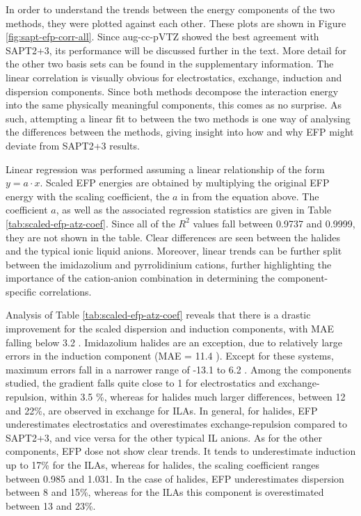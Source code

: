 In order to understand the trends between the energy components of the two methods, they were plotted against each other. 
These plots are shown in Figure \ref{fig:sapt-efp-corr-all}.
Since aug-cc-pVTZ showed the best agreement with SAPT2+3,  its performance will be discussed further in the text. 
More detail for the other two basis sets can be found in the supplementary information.
The linear correlation is visually obvious for electrostatics, exchange, induction and dispersion components.
Since both methods decompose the interaction energy into the same physically meaningful components, this comes as no surprise.
As such, attempting a linear fit to between the two methods is one way of analysing the differences between the methods, giving insight into how and why EFP might deviate from SAPT2+3 results.


Linear regression was performed assuming a linear relationship of the form $ y = a \cdot x $.
Scaled EFP energies are obtained by multiplying the original EFP energy with the scaling coefficient, the $a$ in from the equation above.
The coefficient $a$, as well as the associated regression statistics are given in Table \ref{tab:scaled-efp-atz-coef}.
Since all of the $R^2$ values fall between 0.9737 and 0.9999, they are not shown in the table.
Clear differences are seen between the halides and the typical ionic liquid anions.
Moreover, linear trends can be further split between the imidazolium and pyrrolidinium cations, further highlighting the importance of the cation-anion combination in determining the component-specific correlations.


Analysis of Table \ref{tab:scaled-efp-atz-coef} reveals that there is a drastic improvement for the scaled dispersion and induction components, with MAE falling below 3.2 \enUnit. 
Imidazolium halides are an exception, due to relatively large errors in the induction component (MAE = 11.4 \enUnit).
Except for these systems, maximum errors fall in a narrower range of -13.1 to 6.2 \enUnit.
Among the components studied, the gradient falls quite close to 1 for electrostatics and exchange-repulsion, within 3.5 \%, whereas for halides much larger differences, between 12 and 22\%, are observed in exchange for ILAs.
In general, for halides, EFP underestimates electrostatics and overestimates exchange-repulsion compared to SAPT2+3, and vice versa for the other typical IL anions.
As for the other components, EFP dose not show clear trends.
It tends to  underestimate induction up to 17\% for the ILAs, whereas for halides, the scaling coefficient ranges between 0.985 and 1.031.
In the case of halides, EFP underestimates dispersion between 8 and 15\%, whereas for the ILAs this component is overestimated between 13 and 23\%. 


